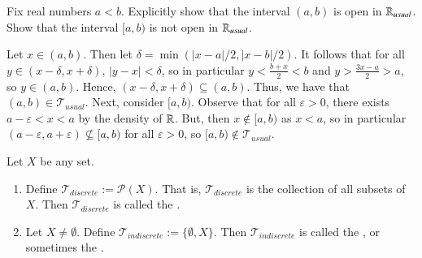 \begin{exercise}
    Fix real numbers $a<b$. Explicitly show that the interval $(a,b)$ is open in $\mathbb R_{usual}$. Show that the interval $[a,b)$ is not open in $\mathbb R_{usual}$.
\end{exercise}
\begin{remark}[Solution]
    Let $x \in (a,b)$. Then let $\delta = \min(|x-a|/2,|x-b|/2)$. It follows that for all $y \in (x-\delta, x+\delta)$, $|y-x| < \delta$, so in particular $y < \frac{b+x}{2} < b$ and $y > \frac{3x-a}{2} > a$, so $y \in (a,b)$. Hence, $(x-\delta,x+\delta) \subseteq (a,b)$. Thus, we have that $(a,b) \in \mathcal{T}_{usual}$. Next, consider $[a,b)$. Observe that for all $\varepsilon > 0$, there exists $a-\varepsilon < x < a$ by the density of $\mathbb R$. But, then $x \notin [a,b)$ as $x < a$, so in particular $(a-\varepsilon,a+\varepsilon) \nsubseteq [a,b)$ for all $\varepsilon > 0$, so $[a,b) \notin \mathcal{T}_{usual}$.
\end{remark}

\begin{example}
    Let $X$ be any set. \begin{enumerate}
        \item Define $\mathcal{T}_{discrete} := \mathcal{P}(X)$. That is, $\mathcal{T}_{discrete}$ is the collection of all subsets of $X$. Then $\mathcal{T}_{discrete}$ is called the .
        \item Let $X \neq \emptyset$. Define $\mathcal{T}_{indiscrete} :=\{\emptyset,X\}$. Then $\mathcal{T}_{indiscrete}$ is called the , or sometimes the .
    \end{enumerate}
\end{example}


